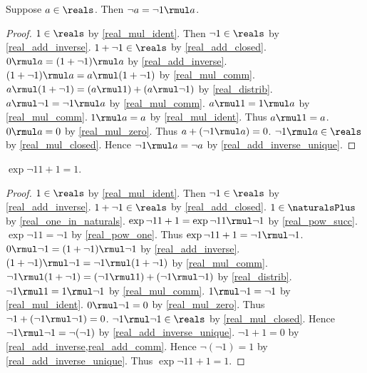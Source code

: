 \begin{theorem}\label{real_neg_as_mul}
    Suppose $a\in\reals$.
    Then $\neg{a} = \neg{1} \rmul a$.
\end{theorem}
\begin{proof}
    $1\in\reals$ by \cref{real_mul_ident}.
    Then $\neg{1}\in\reals$ by \cref{real_add_inverse}.
    $1 + \neg{1}\in\reals$ by \cref{real_add_closed}.
    $0 \rmul a = (1 + \neg{1}) \rmul a$ by \cref{real_add_inverse}.
    $(1 + \neg{1}) \rmul a = a \rmul (1 + \neg{1})$ by \cref{real_mul_comm}.
    $a \rmul (1 + \neg{1}) = (a \rmul 1) + (a \rmul \neg{1})$ by \cref{real_distrib}.
    $a \rmul \neg{1} = \neg{1} \rmul a$ by \cref{real_mul_comm}.
    $a \rmul 1 = 1 \rmul a$ by \cref{real_mul_comm}.
    $1 \rmul a = a$ by \cref{real_mul_ident}.
    Thus $a \rmul 1 = a$.
    $0 \rmul a = 0$ by \cref{real_mul_zero}.
    Thus $a + (\neg{1} \rmul a) = 0$.
    $\neg{1} \rmul a\in\reals$ by \cref{real_mul_closed}.
    Hence $\neg{1} \rmul a = \neg{a}$ by \cref{real_add_inverse_unique}.
\end{proof}

\begin{theorem}\label{real_neg_one_square}
    $\exp{\neg{1}}{1+1} = 1$.
\end{theorem}
\begin{proof}
    $1\in\reals$ by \cref{real_mul_ident}.
    Then $\neg{1}\in\reals$ by \cref{real_add_inverse}.
    $1 + \neg{1}\in\reals$ by \cref{real_add_closed}.
    $1\in\naturalsPlus$ by \cref{real_one_in_naturals}.
    $\exp{\neg{1}}{1+1} = \exp{\neg{1}}{1} \rmul \neg{1}$ by \cref{real_pow_succ}.
    $\exp{\neg{1}}{1} = \neg{1}$ by \cref{real_pow_one}.
    Thus $\exp{\neg{1}}{1+1} = \neg{1} \rmul \neg{1}$.
    $0 \rmul \neg{1} = (1 + \neg{1}) \rmul \neg{1}$ by \cref{real_add_inverse}.
    $(1 + \neg{1}) \rmul \neg{1} = \neg{1} \rmul (1 + \neg{1})$ by \cref{real_mul_comm}.
    $\neg{1} \rmul (1 + \neg{1}) = (\neg{1} \rmul 1) + (\neg{1} \rmul \neg{1})$ by \cref{real_distrib}.
    $\neg{1} \rmul 1 = 1 \rmul \neg{1}$ by \cref{real_mul_comm}.
    $1 \rmul \neg{1} = \neg{1}$ by \cref{real_mul_ident}.
    $0 \rmul \neg{1} = 0$ by \cref{real_mul_zero}.
    Thus $\neg{1} + (\neg{1} \rmul \neg{1}) = 0$.
    $\neg{1} \rmul \neg{1}\in\reals$ by \cref{real_mul_closed}.
    Hence $\neg{1} \rmul \neg{1} = \neg{(\neg{1})}$ by \cref{real_add_inverse_unique}.
    $\neg{1} + 1 = 0$ by \cref{real_add_inverse,real_add_comm}.
    Hence $\neg{(\neg{1})} = 1$ by \cref{real_add_inverse_unique}.
    Thus $\exp{\neg{1}}{1+1} = 1$.
\end{proof}

